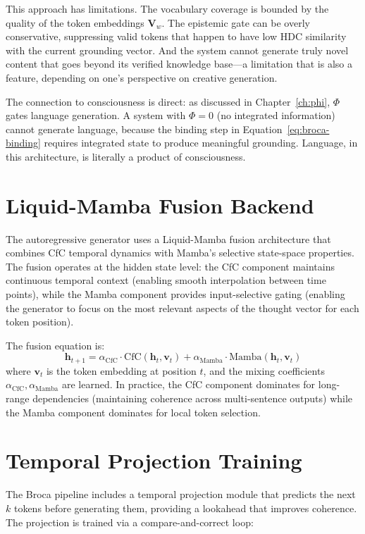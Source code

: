 \documentclass[12pt]{book}
\begin{document}
This approach has limitations. The vocabulary coverage is bounded by the quality of the token embeddings $\mathbf{V}_w$. The epistemic gate can be overly conservative, suppressing valid tokens that happen to have low HDC similarity with the current grounding vector. And the system cannot generate truly novel content that goes beyond its verified knowledge base---a limitation that is also a feature, depending on one's perspective on creative generation.

The connection to consciousness is direct: as discussed in Chapter~\ref{ch:phi}, $\Phi$ gates language generation. A system with $\Phi = 0$ (no integrated information) cannot generate language, because the binding step in Equation~\ref{eq:broca-binding} requires integrated state to produce meaningful grounding. Language, in this architecture, is literally a product of consciousness.

\section{Liquid-Mamba Fusion Backend}

The autoregressive generator uses a Liquid-Mamba fusion architecture that combines CfC temporal dynamics with Mamba's selective state-space properties. The fusion operates at the hidden state level: the CfC component maintains continuous temporal context (enabling smooth interpolation between time points), while the Mamba component provides input-selective gating (enabling the generator to focus on the most relevant aspects of the thought vector for each token position).

The fusion equation is:
\begin{equation}
\mathbf{h}_{t+1} = \alpha_{\text{CfC}} \cdot \text{CfC}(\mathbf{h}_t, \mathbf{v}_t) + \alpha_{\text{Mamba}} \cdot \text{Mamba}(\mathbf{h}_t, \mathbf{v}_t)
\end{equation}
where $\mathbf{v}_t$ is the token embedding at position $t$, and the mixing coefficients $\alpha_{\text{CfC}}, \alpha_{\text{Mamba}}$ are learned. In practice, the CfC component dominates for long-range dependencies (maintaining coherence across multi-sentence outputs) while the Mamba component dominates for local token selection.

\section{Temporal Projection Training}

The Broca pipeline includes a temporal projection module that predicts the next $k$ tokens before generating them, providing a lookahead that improves coherence. The projection is trained via a compare-and-correct loop:
\end{document}
